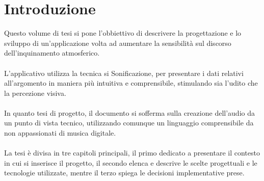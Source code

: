%
\chapter*{Introduzione}                 %
Questo volume di tesi si pone l'obbiettivo di descrivere la progettazione e lo sviluppo di un'applicazione volta ad aumentare la sensibilità sul discorso dell'inquinamento atmosferico.
\\\\
L'applicativo utilizza la tecnica si Sonificazione, per presentare i dati relativi all'argomento in maniera più intuitiva e comprensibile, stimulando sia l'udito che la percezione visiva.
\\\\
In quanto tesi di progetto, il documento si sofferma sulla creazione dell'audio da un punto di vista tecnico, utilizzando comunque un linguaggio comprensibile da non appassionati di musica digitale.
\\\\
La tesi è divisa in tre capitoli principali, il primo dedicato a presentare il contesto in cui si inserisce il progetto, il secondo elenca e descrive le scelte progettuali e le tecnologie utilizzate, mentre il terzo spiega le decisioni implementative prese.


\clearpage{\pagestyle{empty}\cleardoublepage}